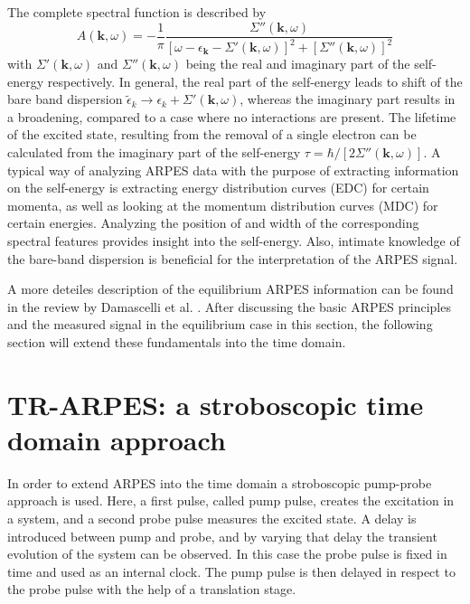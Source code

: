 The complete spectral function is described by
\begin{equation}
	A(\mathbf{k}, \omega)= -\frac{1}{\pi} \frac{\Sigma''(\mathbf{k}, \omega)}{\left[ \omega - \epsilon_\mathbf{k} - \Sigma'(\mathbf{k}, \omega) \right]^2 + \left[ \Sigma''(\mathbf{k}, \omega) \right]^2}
\end{equation}
with $\Sigma'(\mathbf{k}, \omega)$ and $\Sigma''(\mathbf{k}, \omega)$ being the real and imaginary part of the self-energy respectively.
In general, the real part of the self-energy leads to shift of the bare band dispersion $\tilde{\epsilon}_k \rightarrow \epsilon_k + \Sigma'(\mathbf{k}, \omega)$, whereas the imaginary part results in a broadening, compared to a case where no interactions are present.
The lifetime of the excited state, resulting from the removal of a single electron can be calculated from the imaginary part of the self-energy $\tau=\hbar/\left[2\Sigma''(\mathbf{k}, \omega)\right]$.
A typical way of analyzing ARPES data with the purpose of extracting information on the self-energy is extracting energy distribution curves (EDC) for certain momenta, as well as looking at the momentum distribution curves (MDC) for certain energies.
Analyzing the position of and width of the corresponding spectral features provides insight into the self-energy.
Also, intimate knowledge of the bare-band dispersion is beneficial for the interpretation of the ARPES signal.

A more deteiles description of the equilibrium ARPES information can be found in the review by Damascelli et al. \cite{}.
After discussing the basic ARPES principles and the measured signal in the equilibrium case in this section, the following section will extend these fundamentals into the time domain.

\section{TR-ARPES: a stroboscopic time domain approach}

In order to extend ARPES into the time domain a stroboscopic pump-probe approach is used.
Here, a first pulse, called pump pulse, creates the excitation in a system, and a second probe pulse measures the excited state.
A delay is introduced between pump and probe, and by varying that delay the transient evolution of the system can be observed.
In this case the probe pulse is fixed in time and used as an internal clock.
The pump pulse is then delayed in respect to the probe pulse with the help of a translation stage.

